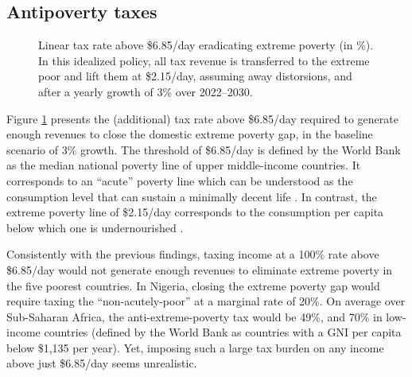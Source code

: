 \documentclass[12pt,english]{article}
\begin{document}
\subsection{Antipoverty taxes}

\begin{figure}[b!]
  \caption[Anti-extreme-poverty tax above \$6.85/day in 2030 after 3\% growth.]{Linear tax rate above \$6.85/day eradicating extreme poverty (in \%). In this idealized policy, all tax revenue is transferred to the extreme poor and lift them at \$2.15/day, assuming away distorsions, and after a yearly growth of 3\% over 2022--2030. 
  }\label{fig:antipoverty_tax_7}
\end{figure}

Figure \ref{fig:antipoverty_tax_7} presents the (additional) tax rate above \$6.85/day required to generate enough revenues to close the domestic extreme poverty gap, in the baseline scenario of 
3\% growth. The threshold of \$6.85/day is defined by the World Bank as the median national poverty line of upper middle-income countries. It corresponds to an ``acute'' poverty line which can be understood as the consumption level that can sustain a minimally decent life \citep{hickel_is_2019,kikstra_decent_2021}. In contrast, the extreme poverty line of \$2.15/day corresponds to the consumption per capita below which one is undernourished \citep{allen_absolute_2017}. 

Consistently with the previous findings, taxing income at a 100\% rate above \$6.85/day would not generate enough revenues to eliminate extreme poverty in the five poorest countries. In Nigeria, closing the extreme poverty gap would require taxing the ``non-acutely-poor'' at a marginal rate of 20\%. 
On average over Sub-Saharan Africa, the anti-extreme-poverty tax would be 49\%, and 70\% in low-income countries (defined by the World Bank as countries with a GNI per capita below \$1,135 per year). Yet, imposing such a large tax burden on any income above just \$6.85/day seems unrealistic. 
\end{document}
